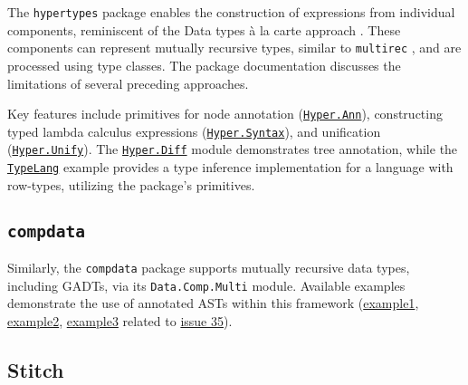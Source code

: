 The \texttt{hypertypes} package \cite{hypertypes-hackage} enables the construction of expressions from individual components, reminiscent of the Data types à la carte approach \cite{swierstra-data-2008}. These components can represent mutually recursive types, similar to \texttt{multirec} \cite{multirec-hackage}, and are processed using type classes. The package documentation discusses the limitations of several preceding approaches.

Key features include primitives for node annotation (\href{https://hackage.haskell.org/package/hypertypes-0.2.2/docs/Hyper-Combinator-Ann.html}{\texttt{Hyper.Ann}}), constructing typed lambda calculus expressions (\href{https://hackage.haskell.org/package/hypertypes-0.2.2/docs/Hyper-Syntax.html}{\texttt{Hyper.Syntax}}), and unification (\href{https://hackage.haskell.org/package/hypertypes-0.2.2/docs/Hyper-Unify.html}{\texttt{Hyper.Unify}}). The \href{https://github.com/lamdu/hypertypes/blob/06cf48ef9c85c54cbe722a448754cb89931b23e7/src/Hyper/Diff.hs}{\texttt{Hyper.Diff}} module demonstrates tree annotation, while the \href{https://github.com/lamdu/hypertypes/tree/06cf48ef9c85c54cbe722a448754cb89931b23e7/test/TypeLang.hs}{\texttt{TypeLang}} example provides a type inference implementation for a language with row-types, utilizing the package's primitives.

\subsection{\texttt{compdata}}
\label{chap:LiteratureReview:sec:AstRepresentations:Compdata}

Similarly, the \texttt{compdata} package \cite{compdata-hackage} supports mutually recursive data types, including GADTs, via its \texttt{Data.Comp.Multi} module. Available examples demonstrate the use of annotated ASTs within this framework (\href{https://github.com/pa-ba/compdata/blob/e916a9ae847b37d7932669f9365de987d09fd9e0/src/Data/Comp/Multi.hs#L322}{example1}, \href{https://github.com/pa-ba/compdata/blob/e916a9ae847b37d7932669f9365de987d09fd9e0/examples/Examples/Multi/Desugar.hs}{example2}, \href{https://gist.github.com/liarokapisv/bb857a23ecd9df945690f73e0acfbe80}{example3} related to \href{https://github.com/pa-ba/compdata/issues/35}{issue 35}).

\subsection{Stitch}
\label{chap:LiteratureReview:sec:AstRepresentations:Stitch}

